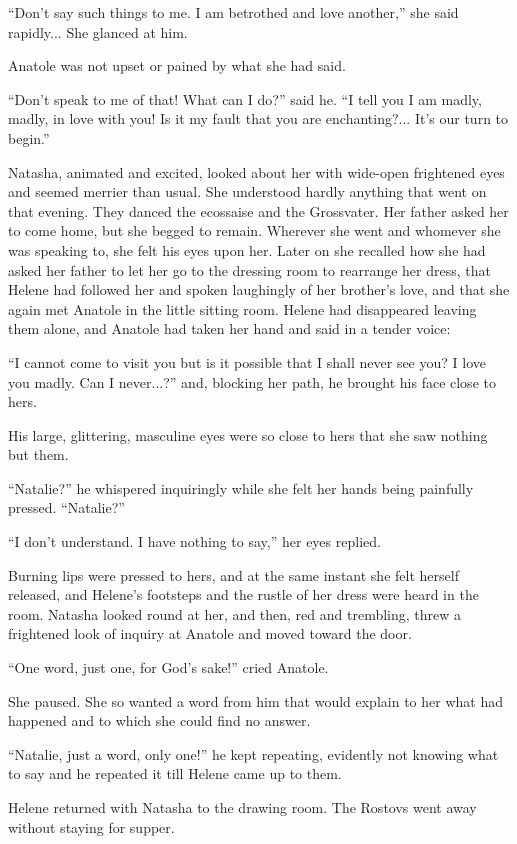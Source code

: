 ``Don't say such things to me. I am betrothed and love another,''
she said rapidly... She glanced at him.

Anatole was not upset or pained by what she had said.

``Don't speak to me of that! What can I do?'' said he. ``I tell
you I am madly, madly, in love with you! Is it my fault that you
are enchanting?... It's our turn to begin.''

Natasha, animated and excited, looked about her with wide-open
frightened eyes and seemed merrier than usual. She understood
hardly anything that went on that evening. They danced the
ecossaise and the Grossvater. Her father asked her to come home,
but she begged to remain.  Wherever she went and whomever she was
speaking to, she felt his eyes upon her. Later on she recalled
how she had asked her father to let her go to the dressing room
to rearrange her dress, that Helene had followed her and spoken
laughingly of her brother's love, and that she again met Anatole
in the little sitting room. Helene had disappeared leaving them
alone, and Anatole had taken her hand and said in a tender voice:

``I cannot come to visit you but is it possible that I shall
never see you? I love you madly. Can I never...?'' and, blocking
her path, he brought his face close to hers.

His large, glittering, masculine eyes were so close to hers that
she saw nothing but them.

``Natalie?'' he whispered inquiringly while she felt her hands
being painfully pressed. ``Natalie?''

``I don't understand. I have nothing to say,'' her eyes replied.

Burning lips were pressed to hers, and at the same instant she
felt herself released, and Helene's footsteps and the rustle of
her dress were heard in the room. Natasha looked round at her,
and then, red and trembling, threw a frightened look of inquiry
at Anatole and moved toward the door.

``One word, just one, for God's sake!'' cried Anatole.

She paused. She so wanted a word from him that would explain to
her what had happened and to which she could find no answer.

``Natalie, just a word, only one!'' he kept repeating, evidently
not knowing what to say and he repeated it till Helene came up to
them.

Helene returned with Natasha to the drawing room. The Rostovs
went away without staying for supper.

